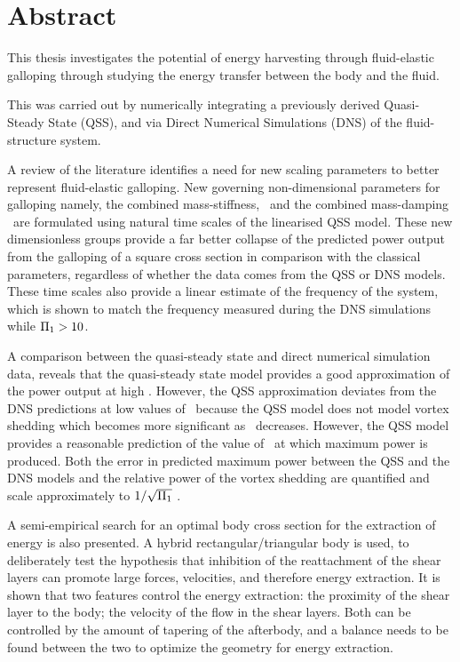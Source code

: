 \chapter*{Abstract}


This thesis investigates the potential of energy harvesting through fluid-elastic galloping through studying the energy transfer between the body and the fluid.

This was carried out by numerically integrating a previously derived Quasi-Steady State (QSS), and via Direct Numerical Simulations (DNS) of the fluid-structure system.

A review of the literature identifies a need for new scaling parameters to better represent fluid-elastic galloping. New governing non-dimensional parameters for galloping namely, the combined mass-stiffness, \massstiff\, and the combined mass-damping \massdamp\ are formulated using natural time scales of the linearised QSS model. These new dimensionless groups provide a far better collapse of the predicted power output from the galloping of a square cross section in comparison with the classical parameters, regardless of whether the data comes from the QSS or DNS models. These time scales also provide a linear estimate of the frequency of the system, which is shown to match the frequency measured during the DNS simulations while $\Pi_1 > 10$.

A comparison between the quasi-steady state and direct numerical simulation data, reveals that the quasi-steady state model provides a good approximation of the power output at high \massstiff. However, the QSS approximation deviates from the DNS predictions at low values of \massstiff\ because the QSS model does not model vortex shedding which becomes more significant as \massstiff\ decreases. However, the QSS model provides a reasonable prediction of the value of \massdamp\ at which maximum power is produced. Both the error in predicted maximum power between the QSS and the DNS models and the relative power of the vortex shedding are quantified and scale approximately to $1/\sqrt{\Pi_1}$ .

A semi-empirical search for an optimal body cross section for the extraction of energy is also presented. A hybrid rectangular/triangular body is used, to deliberately test the hypothesis that inhibition of the reattachment of the shear layers can promote large forces, velocities, and therefore energy extraction. It is shown that two features control the energy extraction: the proximity of the shear layer to the body; the velocity of the flow in the shear layers. Both can be controlled by the amount of tapering of the afterbody, and a balance needs to be found between the two to optimize the geometry for energy extraction.


